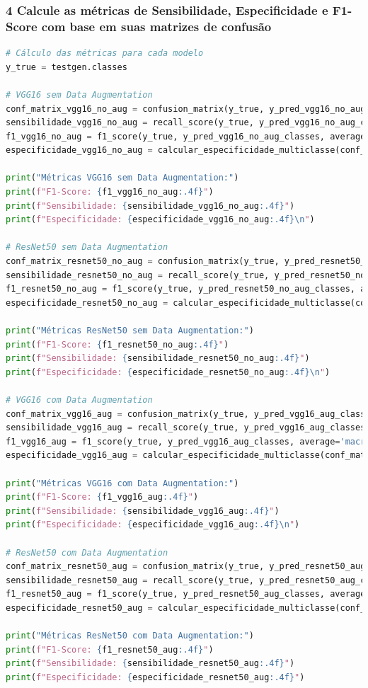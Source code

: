\subsubsection*{4 Calcule as métricas de Sensibilidade, Especificidade e F1-Score com base em suas matrizes de confusão}

\begin{lstlisting}[language=Python, style=input]
# Cálculo das métricas para cada modelo
y_true = testgen.classes

# VGG16 sem Data Augmentation
conf_matrix_vgg16_no_aug = confusion_matrix(y_true, y_pred_vgg16_no_aug_classes)
sensibilidade_vgg16_no_aug = recall_score(y_true, y_pred_vgg16_no_aug_classes, average='macro')
f1_vgg16_no_aug = f1_score(y_true, y_pred_vgg16_no_aug_classes, average='macro')
especificidade_vgg16_no_aug = calcular_especificidade_multiclasse(conf_matrix_vgg16_no_aug)

print("Métricas VGG16 sem Data Augmentation:")
print(f"F1-Score: {f1_vgg16_no_aug:.4f}")
print(f"Sensibilidade: {sensibilidade_vgg16_no_aug:.4f}")
print(f"Especificidade: {especificidade_vgg16_no_aug:.4f}\n")

# ResNet50 sem Data Augmentation
conf_matrix_resnet50_no_aug = confusion_matrix(y_true, y_pred_resnet50_no_aug_classes)
sensibilidade_resnet50_no_aug = recall_score(y_true, y_pred_resnet50_no_aug_classes, average='macro')
f1_resnet50_no_aug = f1_score(y_true, y_pred_resnet50_no_aug_classes, average='macro')
especificidade_resnet50_no_aug = calcular_especificidade_multiclasse(conf_matrix_resnet50_no_aug)

print("Métricas ResNet50 sem Data Augmentation:")
print(f"F1-Score: {f1_resnet50_no_aug:.4f}")
print(f"Sensibilidade: {sensibilidade_resnet50_no_aug:.4f}")
print(f"Especificidade: {especificidade_resnet50_no_aug:.4f}\n")

# VGG16 com Data Augmentation
conf_matrix_vgg16_aug = confusion_matrix(y_true, y_pred_vgg16_aug_classes)
sensibilidade_vgg16_aug = recall_score(y_true, y_pred_vgg16_aug_classes, average='macro')
f1_vgg16_aug = f1_score(y_true, y_pred_vgg16_aug_classes, average='macro')
especificidade_vgg16_aug = calcular_especificidade_multiclasse(conf_matrix_vgg16_aug)

print("Métricas VGG16 com Data Augmentation:")
print(f"F1-Score: {f1_vgg16_aug:.4f}")
print(f"Sensibilidade: {sensibilidade_vgg16_aug:.4f}")
print(f"Especificidade: {especificidade_vgg16_aug:.4f}\n")

# ResNet50 com Data Augmentation
conf_matrix_resnet50_aug = confusion_matrix(y_true, y_pred_resnet50_aug_classes)
sensibilidade_resnet50_aug = recall_score(y_true, y_pred_resnet50_aug_classes, average='macro')
f1_resnet50_aug = f1_score(y_true, y_pred_resnet50_aug_classes, average='macro')
especificidade_resnet50_aug = calcular_especificidade_multiclasse(conf_matrix_resnet50_aug)

print("Métricas ResNet50 com Data Augmentation:")
print(f"F1-Score: {f1_resnet50_aug:.4f}")
print(f"Sensibilidade: {sensibilidade_resnet50_aug:.4f}")
print(f"Especificidade: {especificidade_resnet50_aug:.4f}")
\end{lstlisting}

